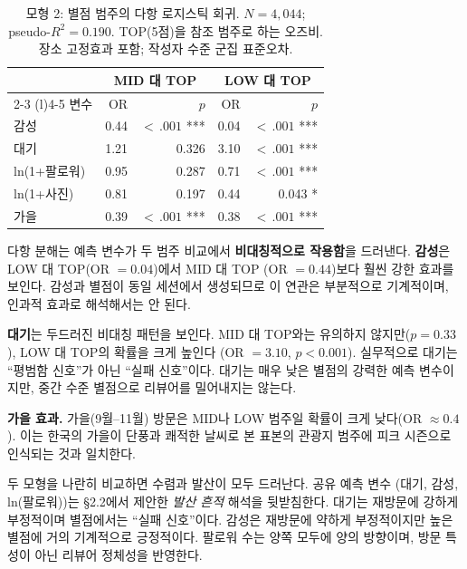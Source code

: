 \documentclass[10pt,a4paper]{article}
\newcommand{\subsect}[1]{\vspace{6pt}\noindent{\large\bfseries #1}\par\vspace{2pt}}
\begin{document}
\begin{table}[H]\centering
\caption{모형 2: 별점 범주의 다항 로지스틱 회귀. $N = 4{,}044$;
pseudo-$R^2 = 0.190$. TOP(5점)을 참조 범주로 하는 오즈비. 장소
고정효과 포함; 작성자 수준 군집 표준오차.}
\label{tab:m2-ko}
\footnotesize
\begin{tabular}{@{}l rr rr@{}}
\toprule
                            & \multicolumn{2}{c}{MID 대 TOP} & \multicolumn{2}{c}{LOW 대 TOP} \\
\cmidrule(lr){2-3} \cmidrule(l){4-5}
변수                        & OR    & $p$          & OR    & $p$ \\
\midrule
감성                        & 0.44  & $<\,.001$ ***  & 0.04  & $<\,.001$ *** \\
대기                        & 1.21  & 0.326        & 3.10  & $<\,.001$ *** \\
ln(1+팔로워)                & 0.95  & 0.287        & 0.71  & $<\,.001$ *** \\
ln(1+사진)                  & 0.81  & 0.197        & 0.44  & 0.043 *      \\
가을                        & 0.39  & $<\,.001$ ***  & 0.38  & $<\,.001$ *** \\
\bottomrule
\end{tabular}
\end{table}

다항 분해는 예측 변수가 두 범주 비교에서 \textbf{비대칭적으로 작용함}을
드러낸다. \textbf{감성}은 LOW 대 TOP(OR $= 0.04$)에서 MID 대 TOP
(OR $= 0.44$)보다 훨씬 강한 효과를 보인다. 감성과 별점이 동일 세션에서
생성되므로 이 연관은 부분적으로 기계적이며, 인과적 효과로 해석해서는
안 된다.

\textbf{대기}는 두드러진 비대칭 패턴을 보인다. MID 대 TOP와는
유의하지 않지만($p = 0.33$), LOW 대 TOP의 확률을 크게 높인다
(OR $= 3.10$, $p < 0.001$). 실무적으로 대기는 ``평범함 신호''가
아닌 ``실패 신호''이다. 대기는 매우 낮은 별점의 강력한 예측 변수이지만,
중간 수준 별점으로 리뷰어를 밀어내지는 않는다.

\textbf{가을 효과.} 가을(9월--11월) 방문은 MID나 LOW 범주일 확률이
크게 낮다(OR $\approx 0.4$). 이는 한국의 가을이 단풍과 쾌적한 날씨로
본 표본의 관광지 범주에 피크 시즌으로 인식되는 것과 일치한다.

\subsect{4.3 두 모형의 통합적 해석}
두 모형을 나란히 비교하면 수렴과 발산이 모두 드러난다. 공유 예측 변수
(대기, 감성, ln(팔로워))는 \S2.2에서 제안한 \emph{발산 흔적} 해석을
뒷받침한다. 대기는 재방문에 강하게 부정적이며 별점에서는 ``실패 신호''이다.
감성은 재방문에 약하게 부정적이지만 높은 별점에 거의 기계적으로
긍정적이다. 팔로워 수는 양쪽 모두에 양의 방향이며, 방문 특성이 아닌
리뷰어 정체성을 반영한다.
\end{document}
